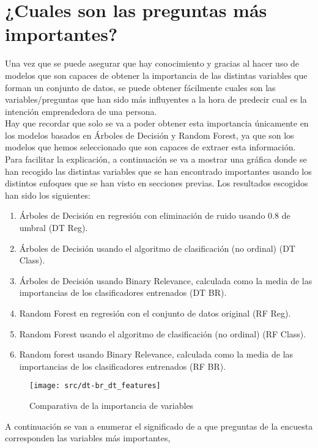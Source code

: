 \section{¿Cuales son las preguntas más importantes?}
Una vez que se puede asegurar que hay conocimiento y gracias al hacer uso de modelos que son capaces de obtener la importancia de las distintas variables que forman un conjunto de datos, se puede obtener fácilmente cuales son las variables/preguntas que han sido más influyentes a la hora de predecir cual es la intención emprendedora de una persona.\\
Hay que recordar que solo se va a poder obtener esta importancia únicamente en los modelos basados en Árboles de Decisión y Random Forest, ya que son los modelos que hemos seleccionado que son capaces de extraer esta información.\\
\linebreak
Para facilitar la explicación, a continuación se va a mostrar una gráfica donde se han recogido las distintas variables que se han encontrado importantes usando los distintos enfoques que se han visto en secciones previas. Los resultados escogidos han sido los siguientes:
\begin{enumerate}
	\item Árboles de Decisión en regresión con eliminación de ruido usando $0.8$ de umbral (DT Reg).
	\item Árboles de Decisión usando el algoritmo de clasificación (no ordinal) (DT Class).
	\item Árboles de Decisión usando Binary Relevance, calculada como la media de las importancias de los clasificadores entrenados (DT BR).
	\item Random Forest en regresión con el conjunto de datos original (RF Reg).
	\item Random Forest usando el algoritmo de clasificación (no ordinal) (RF Class).
	\item Random forest usando Binary Relevance, calculada como la media de las importancias de los clasificadores entrenados (RF BR).
\end{enumerate}
\begin{figure}[H]
	\centering
	\texttt{[image: src/dt-br\_dt\_features]}
	\label{fig:dt_ft_cmp1}
	\caption{Comparativa de la importancia de variables}
\end{figure}
A continuación se van a enumerar el significado de a que preguntas de la encuesta corresponden las variables más importantes,
